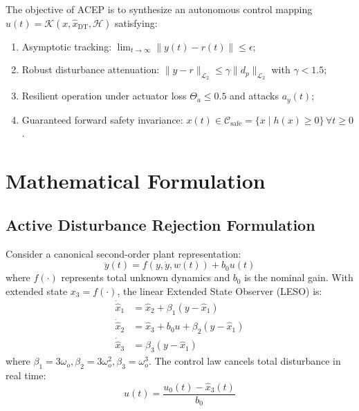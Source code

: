 \documentclass[journal,twocolumn]{IEEEtran}
\begin{document}
The objective of ACEP is to synthesize an autonomous control mapping $u(t) = \mathcal{K}(x, \hat{x}_{\text{DT}}, \mathcal{H})$ satisfying:
\begin{enumerate}
    \item Asymptotic tracking: $\lim_{t \to \infty} \|y(t) - r(t)\| \le \epsilon$;
    \item Robust disturbance attenuation: $\|y - r\|_{\mathcal{L}_2} \le \gamma \|d_p\|_{\mathcal{L}_2}$ with $\gamma < 1.5$;
    \item Resilient operation under actuator loss $\Theta_a \le 0.5$ and attacks $a_y(t)$;
    \item Guaranteed forward safety invariance: $x(t) \in \mathcal{C}_{\text{safe}} = \{x \mid h(x) \ge 0\} \, \forall t \ge 0$.
\end{enumerate}

\section{Mathematical Formulation}

\subsection{Active Disturbance Rejection Formulation}
Consider a canonical second-order plant representation:
\begin{equation}
    \ddot{y}(t) = f(y, \dot{y}, w(t)) + b_0 u(t)
    \label{eq:adrc_plant}
\end{equation}
where $f(\cdot)$ represents total unknown dynamics and $b_0$ is the nominal gain. With extended state $x_3 = f(\cdot)$, the linear Extended State Observer (LESO) is:
\begin{align}
    \dot{\hat{x}}_1 &= \hat{x}_2 + \beta_1 (y - \hat{x}_1) \nonumber \\
    \dot{\hat{x}}_2 &= \hat{x}_3 + b_0 u + \beta_2 (y - \hat{x}_1) \label{eq:leso} \\
    \dot{\hat{x}}_3 &= \beta_3 (y - \hat{x}_1) \nonumber
\end{align}
where $\beta_1 = 3\omega_o, \beta_2 = 3\omega_o^2, \beta_3 = \omega_o^3$. The control law cancels total disturbance in real time:
\begin{equation}
    u(t) = \frac{u_0(t) - \hat{x}_3(t)}{b_0}
    \label{eq:adrc_u}
\end{equation}
\end{document}
